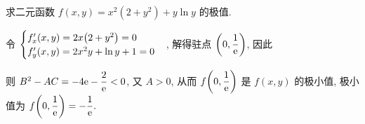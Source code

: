 \begin{example}[2009 数一]
    求二元函数 $f(x, y)=x^{2}\left(2+y^{2}\right)+y \ln y $ 的极值.
\end{example}
\begin{solution}
    令 $\begin{cases}
        f_x'(x,y)=2x\qty(2+y^2)=0\\
        f_y'(x,y)=2x^2y+\ln y+1=0
    \end{cases}$, 解得驻点 $\qty(0,\dfrac{1}{\mathrm{e}})$, 因此 
    则 $B^2-AC=-4\mathrm{e}-\dfrac{2}{\mathrm{e}}<0$, 又 $A>0$, 从而 $f\qty(0,\dfrac{1}{\mathrm{e}})$ 是 $f(x,y)$ 的极小值, 极小值为 $f\qty(0,\dfrac{1}{\mathrm{e}})=-\dfrac{1}{\mathrm{e}}.$
\end{solution}

